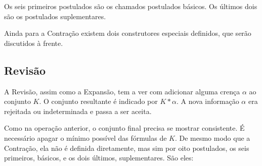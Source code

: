 Os seis primeiros postulados são os chamados postulados básicos. Os últimos dois são os postulados suplementares.

Ainda para a Contração existem dois construtores especiais definidos, que serão discutidos à frente.

\subsection{Revisão}

A Revisão, assim como a Expansão, tem a ver com adicionar alguma crença $ \alpha $ ao conjunto $ K $. O conjunto resultante é indicado por $ K \ast \alpha $. A nova informação $ \alpha $ era rejeitada ou indeterminada e passa a ser aceita.

Como na operação anterior, o conjunto final precisa se mostrar consistente. É necessário apagar o mínimo possível das fórmulas de $ K $. De mesmo modo que a Contração, ela não é definida diretamente, mas sim por oito postulados, os seis primeiros, básicos, e os dois últimos, suplementares. São eles:

